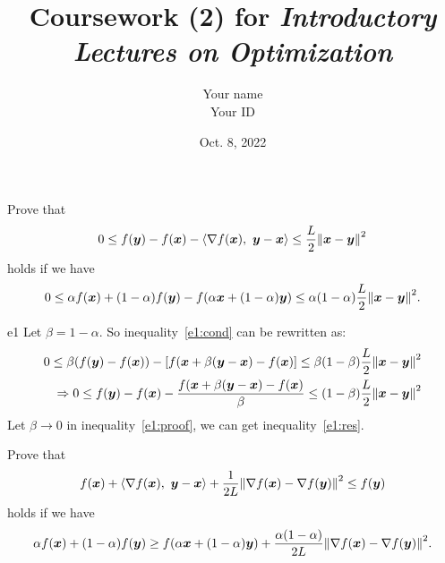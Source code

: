 \documentclass{article}
\title{Coursework (2) for \emph{Introductory Lectures on Optimization}}
\author{Your name \\ Your ID}
\date{Oct. 8, 2022}
\newcommand{\xB}{\bm{x}}
\renewcommand{\grad}{\nabla}
\newcommand{\yB}{\bm{y}}
\begin{document}
\maketitle

\begin{excercise}\label{e1}
    Prove that
    \begin{equation}\label{e1:res}
        0 \leq f(\yB) - f(\xB) - \innerprod{\grad f(\xB)}{\yB - \xB} \leq \frac{L}{2} \norm{\xB - \yB}^2
    \end{equation}
    holds if we have
    \begin{equation}\label{e1:cond}
        0 \leq \alpha f(\xB) + (1-\alpha) f(\yB) - f( \alpha \xB + (1-\alpha) \yB) \leq 
            \alpha (1-\alpha) \frac{L}{2} \norm{\xB - \yB}^2. 
    \end{equation}
\end{excercise}

\begin{PROOF}{e1}  
    Let \(\beta = 1- \alpha\). So inequality~\ref{e1:cond} can be rewritten as:
    \begin{equation}\label{e1:proof}
        \begin{aligned}
            0 \le \beta (f(\yB) - f(\xB)) - [f(\xB + \beta (\yB - \xB) - f(\xB)] \le \beta (1-\beta) \frac{L}{2} \norm{\xB - \yB}^2\\
            \Rightarrow 0 \le f(\yB) - f(\xB) - \frac{f(\xB + \beta (\yB - \xB) - f(\xB)}{\beta} \le (1-\beta) \frac{L}{2} \norm{\xB - \yB}^2
        \end{aligned}
    \end{equation}
    Let \(\beta \to 0\) in inequality~\ref{e1:proof}, we can get inequality~\ref{e1:res}.
\end{PROOF}

\begin{excercise}\label{e2}
    Prove that
    \begin{equation}\label{e2:res}
        f(\xB) + \innerprod{\grad f(\xB)}{\yB - \xB} + \frac{1}{2L} \norm{\grad f(\xB) - \grad f(\yB)}^2 \leq f(\yB)
    \end{equation}
    holds if we have
    \begin{equation}\label{e2:cond}
    \alpha f(\xB) + (1-\alpha) f(\yB) \geq f(\alpha \xB + (1-\alpha) \yB) 
        + \frac{\alpha(1-\alpha)}{2L} \norm{\grad f(\xB) - \grad f(\yB)}^2.
    \end{equation}
\end{excercise}
\end{document}

